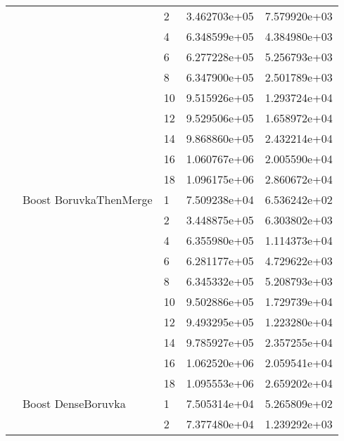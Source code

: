 \begin{tabular}{lllrr}
                      &                     & 2  &  3.462703e+05 &  7.579920e+03 \\
                      &                     & 4  &  6.348599e+05 &  4.384980e+03 \\
                      &                     & 6  &  6.277228e+05 &  5.256793e+03 \\
                      &                     & 8  &  6.347900e+05 &  2.501789e+03 \\
                      &                     & 10 &  9.515926e+05 &  1.293724e+04 \\
                      &                     & 12 &  9.529506e+05 &  1.658972e+04 \\
                      &                     & 14 &  9.868860e+05 &  2.432214e+04 \\
                      &                     & 16 &  1.060767e+06 &  2.005590e+04 \\
                      &                     & 18 &  1.096175e+06 &  2.860672e+04 \\
                      & Boost BoruvkaThenMerge & 1  &  7.509238e+04 &  6.536242e+02 \\
                      &                     & 2  &  3.448875e+05 &  6.303802e+03 \\
                      &                     & 4  &  6.355980e+05 &  1.114373e+04 \\
                      &                     & 6  &  6.281177e+05 &  4.729622e+03 \\
                      &                     & 8  &  6.345332e+05 &  5.208793e+03 \\
                      &                     & 10 &  9.502886e+05 &  1.729739e+04 \\
                      &                     & 12 &  9.493295e+05 &  1.223280e+04 \\
                      &                     & 14 &  9.785927e+05 &  2.357255e+04 \\
                      &                     & 16 &  1.062520e+06 &  2.059541e+04 \\
                      &                     & 18 &  1.095553e+06 &  2.659202e+04 \\
                      & Boost DenseBoruvka & 1  &  7.505314e+04 &  5.265809e+02 \\
                      &                     & 2  &  7.377480e+04 &  1.239292e+03 \\

\end{tabular}
